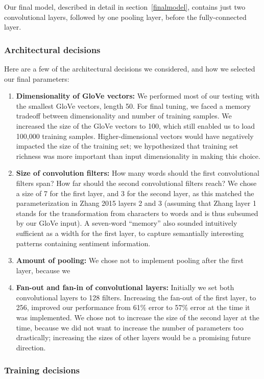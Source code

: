 \documentclass{article}
\begin{document}
Our final model, described in detail in section~\ref{finalmodel}, contains just two convolutional layers, followed by one pooling layer, before the fully-connected layer.

\subsubsection*{Architectural decisions}

Here are a few of the architectural decisions we considered, and how we selected our final parameters:
\begin{enumerate}
\item{\textbf{Dimensionality of GloVe vectors:}} We performed most of our testing with the smallest GloVe vectors, length 50. For final tuning, we faced a memory tradeoff between dimensionality and number of training samples. We increased the size of the GloVe vectors to 100, which still enabled us to load 100,000 training samples. Higher-dimensional vectors would have negatively impacted the size of the training set; we hypothesized that training set richness was more important than input dimensionality in making this choice.
\item{\textbf{Size of convolution filters:}} How many words should the first convolutional filters span? How far should the second convolutional filters reach? We chose a size of 7 for the first layer, and 3 for the second layer, as this matched the parameterization in Zhang 2015 layers 2 and 3 (assuming that Zhang layer 1 stands for the transformation from characters to words and is thus subsumed by our GloVe input). A seven-word ``memory'' also sounded intuitively sufficient as a width for the first layer, to capture semantially interesting patterns containing sentiment information.
\item{\textbf{Amount of pooling:}} We chose not to implement pooling after the first layer, because we 
\item{\textbf{Fan-out and fan-in of convolutional layers:}} Initially we set both convolutional layers to 128 filters. Increasing the fan-out of the first layer, to 256, improved our performance from 61\% error to 57\% error at the time it was implemented. We chose not to increase the size of the second layer at the time, because we did not want to increase the number of parameters too drastically; increasing the sizes of other layers would be a promising future direction.
\end{enumerate}

\subsubsection*{Training decisions}
\end{document}
